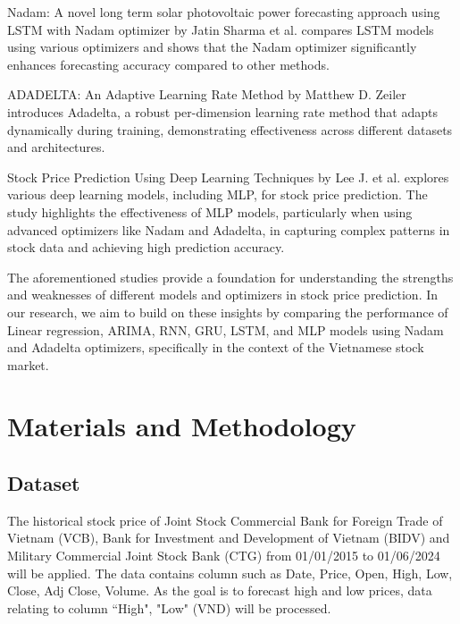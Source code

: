 \documentclass{ieeeojies}
\begin{document}
Nadam: A novel long term solar photovoltaic power forecasting approach using LSTM with Nadam optimizer by Jatin Sharma et al. compares LSTM models using various optimizers and shows that the Nadam optimizer significantly enhances forecasting accuracy compared to other methods. \cite{b4} 

ADADELTA: An Adaptive Learning Rate Method by Matthew D. Zeiler introduces Adadelta, a robust per-dimension learning rate method that adapts dynamically during training, demonstrating effectiveness across different datasets and architectures. \cite{b5} 

Stock Price Prediction Using Deep Learning Techniques by Lee J. et al. explores various deep learning models, including MLP, for stock price prediction. The study highlights the effectiveness of MLP models, particularly when using advanced optimizers like Nadam and Adadelta, in capturing complex patterns in stock data and achieving high prediction accuracy. \cite{b6}

The aforementioned studies provide a foundation for understanding the strengths and weaknesses of different models and optimizers in stock price prediction. In our research, we aim to build on these insights by comparing the performance of Linear regression, ARIMA, RNN, GRU, LSTM, and MLP models using Nadam and Adadelta optimizers, specifically in the context of the Vietnamese stock market.

\section{Materials and Methodology}
\subsection{Dataset}
The historical stock price of Joint Stock Commercial Bank for Foreign Trade of Vietnam (VCB), Bank for Investment and Development of Vietnam (BIDV) and Military Commercial Joint Stock Bank (CTG) from 01/01/2015 to 01/06/2024 will be applied. The data contains column such as Date, Price, Open, High, Low, Close, Adj Close, Volume. As the goal is to forecast high and low prices, data relating to column “High", "Low" (VND) will be processed.
\end{document}
